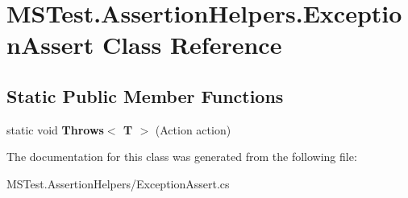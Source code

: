 \hypertarget{class_m_s_test_1_1_assertion_helpers_1_1_exception_assert}{\section{M\-S\-Test.\-Assertion\-Helpers.\-Exception\-Assert Class Reference}
\label{class_m_s_test_1_1_assertion_helpers_1_1_exception_assert}
}
\subsection*{Static Public Member Functions}
\begin{DoxyCompactItemize}
\item 
\hypertarget{class_m_s_test_1_1_assertion_helpers_1_1_exception_assert_acb27c67670b306400e8a68dfcc1f0101}{static void {\bfseries Throws$<$ T $>$} (Action action)}\label{class_m_s_test_1_1_assertion_helpers_1_1_exception_assert_acb27c67670b306400e8a68dfcc1f0101}

\end{DoxyCompactItemize}


The documentation for this class was generated from the following file\-:\begin{DoxyCompactItemize}
\item 
M\-S\-Test.\-Assertion\-Helpers/Exception\-Assert.\-cs\end{DoxyCompactItemize}

